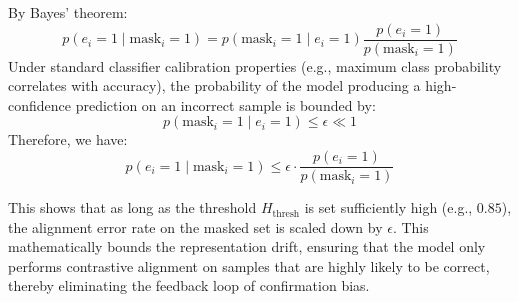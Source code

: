 \documentclass{article}
\theoremstyle{plain}
\theoremstyle{definition}
\theoremstyle{remark}
\begin{document}
By Bayes' theorem:
\begin{equation}
    p(e_i = 1 \mid \text{mask}_i = 1) = p(\text{mask}_i = 1 \mid e_i = 1) \frac{p(e_i = 1)}{p(\text{mask}_i = 1)}
\end{equation}
Under standard classifier calibration properties (e.g., maximum class probability correlates with accuracy), the probability of the model producing a high-confidence prediction on an incorrect sample is bounded by:
\begin{equation}
    p(\text{mask}_i = 1 \mid e_i = 1) \le \epsilon \ll 1
\end{equation}
Therefore, we have:
\begin{equation}
    p(e_i = 1 \mid \text{mask}_i = 1) \le \epsilon \cdot \frac{p(e_i = 1)}{p(\text{mask}_i = 1)}
\end{equation}

This shows that as long as the threshold $H_{\text{thresh}}$ is set sufficiently high (e.g., $0.85$), the alignment error rate on the masked set is scaled down by $\epsilon$. This mathematically bounds the representation drift, ensuring that the model only performs contrastive alignment on samples that are highly likely to be correct, thereby eliminating the feedback loop of confirmation bias.
\end{document}
